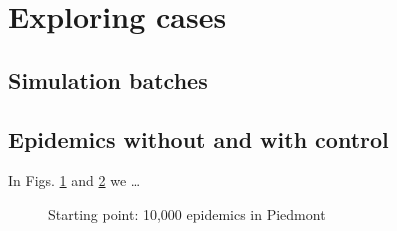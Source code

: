 \documentclass[graybox]{svmult}
\begin{document}
\section{Exploring cases}
\label{exploring}

\subsection{Simulation batches}
\label{batches}

\subsection{Epidemics without and with control}
\label{withoutWith}

In Figs. \ref{10kNoControl} and \ref{10kBasicC} we \ldots

\begin{figure}[t]

 \begin{subfigure}{0.48\textwidth}
 \centering
 \label{10kNoControl}
 \end{subfigure}
 \hfill
 \begin{subfigure}{0.48\textwidth}
 \centering
 \label{10kBasicC}
 \end{subfigure}
 \caption{Starting point: 10,000 epidemics in Piedmont}
 \label{withoutWithFig}
\end{figure}
\end{document}
